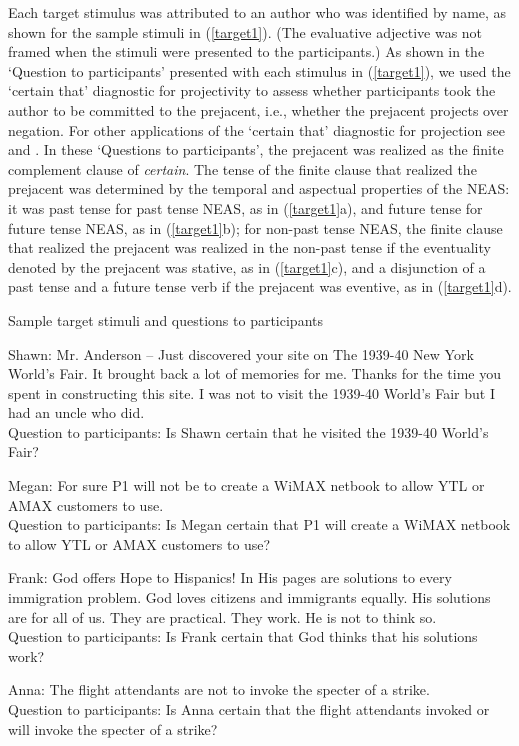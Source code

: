 \documentclass[11pt,fleqn]{article}
\newcommand{\6}{\mbox{$[\hspace*{-.6mm}[$}}
\newcommand{\9}{\mbox{$]\hspace*{-.6mm}]$}}
\begin{document}
Each target stimulus was attributed to an author who was identified by name, as shown for the sample stimuli in (\ref{target1}). (The evaluative adjective was not framed when the stimuli were presented to the participants.) As shown in the `Question to participants' presented with each stimulus in (\ref{target1}), we used the `certain that' diagnostic for projectivity to assess whether participants took the author to be committed to the prejacent, i.e., whether the prejacent projects over negation. For other applications of the `certain that' diagnostic for projection see \citealt{tonhauser-salt26,djaerv-bacovcin-salt27,stevens-etal2017} and \citealt{tbd-variability}. In these `Questions to participants', the prejacent was realized as the finite complement clause of {\em certain}. The tense of the finite clause that realized the prejacent was determined by the temporal and aspectual properties of the
NEAS: it was past tense for past tense NEAS, as in (\ref{target1}a), and future tense for future tense NEAS, as in (\ref{target1}b); for non-past tense NEAS, the finite clause that realized the prejacent was realized in the non-past tense if the eventuality denoted by the prejacent was
stative, as in (\ref{target1}c), and a disjunction of a past tense and a future tense verb if the prejacent was eventive, as in (\ref{target1}d).


\begin{exe} \ex\label{target1} Sample target stimuli and questions to
participants 

\begin{xlist} 

\ex Shawn: Mr. Anderson --  Just discovered your
site on The 1939-40 New York World's Fair. It brought back a lot of
memories for me. Thanks for the time you spent in constructing this
site. I was not  to visit the 1939-40 World's Fair but I
had an uncle who did.
\\ Question to participants: Is Shawn certain that he visited the 1939-40 World's Fair?

\ex Megan: For sure P1 will not be  to create a WiMAX netbook to allow YTL or AMAX customers to use.
\\ Question to participants: Is Megan certain that P1 will create a WiMAX netbook to allow YTL or AMAX customers to use?

\ex Frank: God offers Hope to Hispanics! In His pages are solutions to every immigration problem. God loves citizens and immigrants equally. His solutions are for all of us. They are practical. They work. He is not  to think so.
\\ Question to participants: Is Frank certain that God thinks that his solutions work?

\ex Anna: The flight attendants are not  to invoke the specter
of a strike. \\ Question to participants: Is Anna certain that the
flight attendants invoked or will invoke the specter of a strike?

\end{xlist}
\end{exe}
\end{document}
